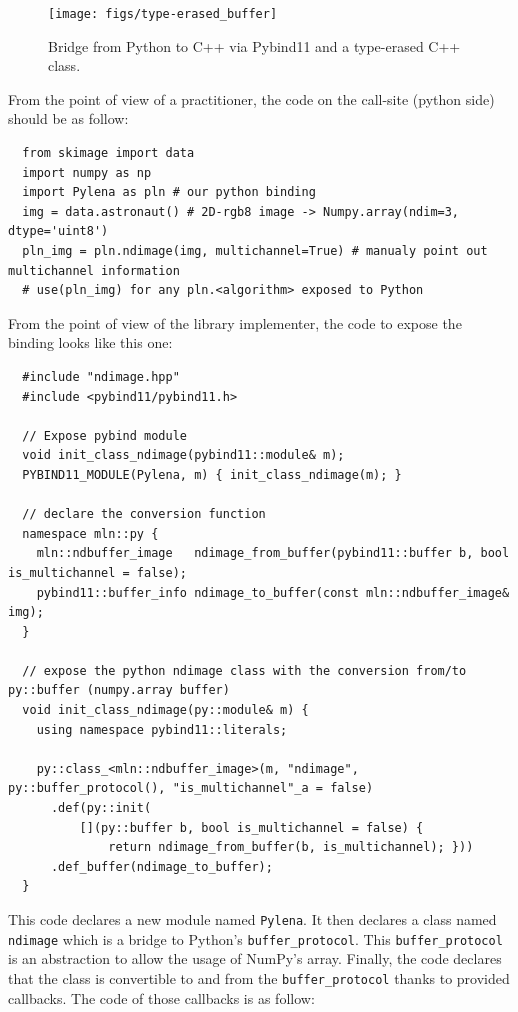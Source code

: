 \begin{figure}[tbh]
  \centering
  \texttt{[image: figs/type-erased\_buffer]}
  \caption{Bridge from Python to C++ via Pybind11 and a type-erased C++ class.}
  \label{fig:type-erased.buffer}
\end{figure}

From the point of view of a practitioner, the code on the call-site (python side) should be as follow:
\begin{verbatim}
  from skimage import data
  import numpy as np
  import Pylena as pln # our python binding
  img = data.astronaut() # 2D-rgb8 image -> Numpy.array(ndim=3, dtype='uint8')
  pln_img = pln.ndimage(img, multichannel=True) # manualy point out multichannel information
  # use(pln_img) for any pln.<algorithm> exposed to Python
\end{verbatim}

From the point of view of the library implementer, the code to expose the binding looks like this one:
\begin{verbatim}
  #include "ndimage.hpp"
  #include <pybind11/pybind11.h>

  // Expose pybind module
  void init_class_ndimage(pybind11::module& m);
  PYBIND11_MODULE(Pylena, m) { init_class_ndimage(m); }

  // declare the conversion function
  namespace mln::py {
    mln::ndbuffer_image   ndimage_from_buffer(pybind11::buffer b, bool is_multichannel = false);
    pybind11::buffer_info ndimage_to_buffer(const mln::ndbuffer_image& img);
  }

  // expose the python ndimage class with the conversion from/to py::buffer (numpy.array buffer)
  void init_class_ndimage(py::module& m) {
    using namespace pybind11::literals;

    py::class_<mln::ndbuffer_image>(m, "ndimage", py::buffer_protocol(), "is_multichannel"_a = false)
      .def(py::init(
          [](py::buffer b, bool is_multichannel = false) {
              return ndimage_from_buffer(b, is_multichannel); }))
      .def_buffer(ndimage_to_buffer);
  }
\end{verbatim}

This code declares a new module named \texttt{Pylena}. It then declares a class named \texttt{ndimage} which is a bridge
to Python's \texttt{buffer\_protocol}. This \texttt{buffer\_protocol} is an abstraction to allow the usage of NumPy's
array. Finally, the code declares that the class is convertible to and from the \texttt{buffer\_protocol} thanks to
provided callbacks. The code of those callbacks is as follow:

